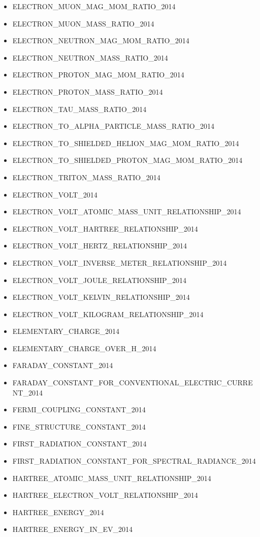 \begin{itemize}
\item ELECTRON\_MUON\_MAG\_MOM\_RATIO\_2014
\item ELECTRON\_MUON\_MASS\_RATIO\_2014
\item ELECTRON\_NEUTRON\_MAG\_MOM\_RATIO\_2014
\item ELECTRON\_NEUTRON\_MASS\_RATIO\_2014
\item ELECTRON\_PROTON\_MAG\_MOM\_RATIO\_2014
\item ELECTRON\_PROTON\_MASS\_RATIO\_2014
\item ELECTRON\_TAU\_MASS\_RATIO\_2014
\item ELECTRON\_TO\_ALPHA\_PARTICLE\_MASS\_RATIO\_2014
\item ELECTRON\_TO\_SHIELDED\_HELION\_MAG\_MOM\_RATIO\_2014
\item ELECTRON\_TO\_SHIELDED\_PROTON\_MAG\_MOM\_RATIO\_2014
\item ELECTRON\_TRITON\_MASS\_RATIO\_2014
\item ELECTRON\_VOLT\_2014
\item ELECTRON\_VOLT\_ATOMIC\_MASS\_UNIT\_RELATIONSHIP\_2014
\item ELECTRON\_VOLT\_HARTREE\_RELATIONSHIP\_2014
\item ELECTRON\_VOLT\_HERTZ\_RELATIONSHIP\_2014
\item ELECTRON\_VOLT\_INVERSE\_METER\_RELATIONSHIP\_2014
\item ELECTRON\_VOLT\_JOULE\_RELATIONSHIP\_2014
\item ELECTRON\_VOLT\_KELVIN\_RELATIONSHIP\_2014
\item ELECTRON\_VOLT\_KILOGRAM\_RELATIONSHIP\_2014
\item ELEMENTARY\_CHARGE\_2014
\item ELEMENTARY\_CHARGE\_OVER\_H\_2014
\item FARADAY\_CONSTANT\_2014
\item FARADAY\_CONSTANT\_FOR\_CONVENTIONAL\_ELECTRIC\_CURRENT\_2014
\item FERMI\_COUPLING\_CONSTANT\_2014
\item FINE\_STRUCTURE\_CONSTANT\_2014
\item FIRST\_RADIATION\_CONSTANT\_2014
\item FIRST\_RADIATION\_CONSTANT\_FOR\_SPECTRAL\_RADIANCE\_2014
\item HARTREE\_ATOMIC\_MASS\_UNIT\_RELATIONSHIP\_2014
\item HARTREE\_ELECTRON\_VOLT\_RELATIONSHIP\_2014
\item HARTREE\_ENERGY\_2014
\item HARTREE\_ENERGY\_IN\_EV\_2014

\end{itemize}
